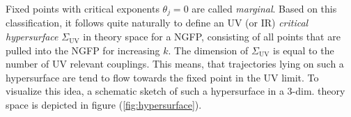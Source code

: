 Fixed points with critical exponents $\theta_{j}=0$ are called \textit{marginal}. Based on this classification, it follows quite naturally to define an UV (or IR)  \textit{critical hypersurface} $\Sigma_{\mathrm{UV}}$ in theory space for a NGFP, consisting of all points that are pulled into the NGFP for increasing $k$. The dimension of $\Sigma_{\mathrm{UV}}$ is equal to the number of UV relevant couplings. This means, that trajectories lying on such a hypersurface are tend to flow towards the fixed point in the UV limit. To visualize this idea, a schematic sketch of such a hypersurface in a $3$-dim. theory space is depicted in figure (\ref{fig:hypersurface}).